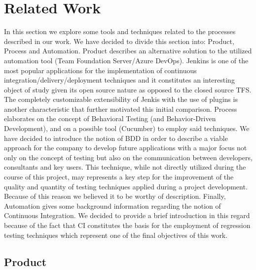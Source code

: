 \chapter{Related Work}

In this section we explore some tools and techniques related to the processes described in our work. We have decided to divide this section into: Product, Process and Automation. Product describes an alternative solution to the utilized automation tool (Team Foundation Server/Azure DevOps). Jenkins is one of the most popular applications for the implementation of continuous integration/delivery/deployment techniques and it constitutes an interesting object of study given its open source nature as opposed to the closed source TFS. The completely customizable extensibility of Jenkis with the use of plugins is another characteristic that further motivated this initial comparison. Process elaborates on the concept of Behavioral Testing (and Behavior-Driven Development), and on a possible tool (Cucumber) to employ said techniques. We have decided to introduce the notion of BDD in order to describe a viable approach for the company to develop future applications with a major focus not only on the concept of testing but also on the communication between developers, consultants and key users. This technique, while not directly utilized during the course of this project, may represents a key step for the improvement of the quality and quantity of testing techniques applied during a project development. Because of this reason we believed it to be worthy of description. Finally, Automation gives some background information regarding the notion of Continuous Integration. We decided to provide a brief introduction in this regard because of the fact that CI constitutes the basis for the employment of regression testing techniques which represent one of the final objectives of this work.

\section{Product} 


